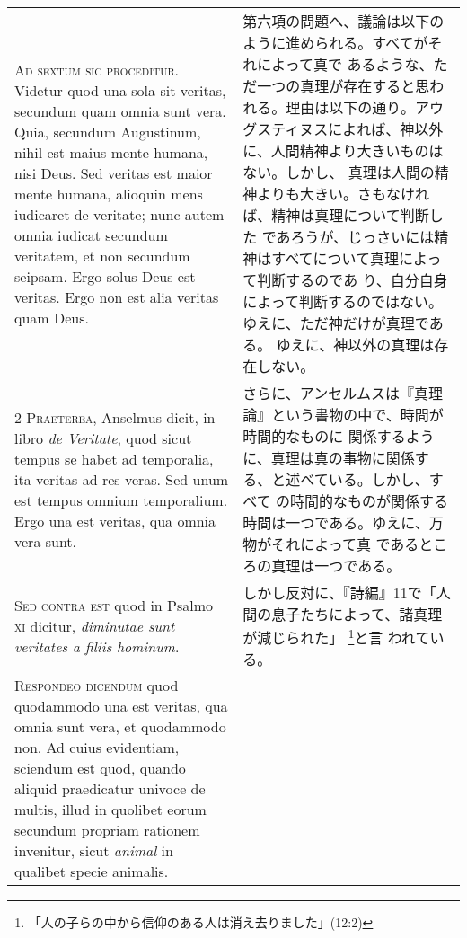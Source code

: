 \documentclass[10pt]{jsarticle} %
\begin{document}
\begin{longtable}{p{21em}p{21em}}

{\huge A}{\scshape d sextum sic proceditur}. Videtur quod una sola sit
veritas, secundum quam omnia sunt vera. Quia, secundum Augustinum,
nihil est maius mente humana, nisi Deus. Sed veritas est maior mente
humana, alioquin mens iudicaret de veritate; nunc autem omnia iudicat
secundum veritatem, et non secundum seipsam. Ergo solus Deus est
veritas. Ergo non est alia veritas quam Deus.

&

第六項の問題へ、議論は以下のように進められる。すべてがそれによって真で
あるような、ただ一つの真理が存在すると思われる。理由は以下の通り。アウ
グスティヌスによれば、神以外に、人間精神より大きいものはない。しかし、
真理は人間の精神よりも大きい。さもなければ、精神は真理について判断した
であろうが、じっさいには精神はすべてについて真理によって判断するのであ
り、自分自身によって判断するのではない。ゆえに、ただ神だけが真理である。
ゆえに、神以外の真理は存在しない。

\\

2 {\scshape Praeterea}, Anselmus dicit, in libro {\itshape de
Veritate}, quod sicut tempus se habet ad temporalia, ita veritas ad
res veras. Sed unum est tempus omnium temporalium. Ergo una est
veritas, qua omnia vera sunt.

&

さらに、アンセルムスは『真理論』という書物の中で、時間が時間的なものに
関係するように、真理は真の事物に関係する、と述べている。しかし、すべて
の時間的なものが関係する時間は一つである。ゆえに、万物がそれによって真
であるところの真理は一つである。

\\

{\scshape Sed contra est} quod in Psalmo {\scshape xi} dicitur,
{\itshape diminutae sunt veritates a filiis hominum}.


&

しかし反対に、『詩編』11で「人間の息子たちによって、諸真理が減じられた」
\footnote{「人の子らの中から信仰のある人は消え去りました」(12:2)}と言
われている。

\\

{\scshape Respondeo dicendum} quod quodammodo una est veritas, qua
omnia sunt vera, et quodammodo non. Ad cuius evidentiam, sciendum est
quod, quando aliquid praedicatur univoce de multis, illud in quolibet
eorum secundum propriam rationem invenitur, sicut {\itshape animal} in
qualibet specie animalis.


\end{longtable}
\end{document}
